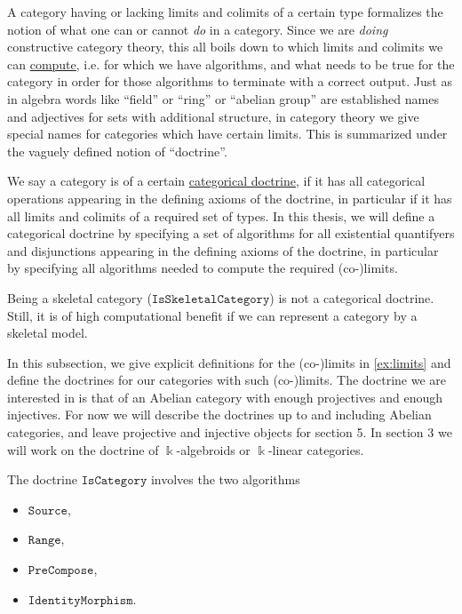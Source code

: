 A category having or lacking limits and colimits of a certain type formalizes the notion of what one can or cannot \textit{do} in a category.
Since we are \textit{doing} constructive category theory, this all boils down to which limits and colimits we can \ul{compute}, i.e. for which we
have algorithms, and what needs to be true for the category in order for those algorithms to terminate with a correct output.
Just as in algebra words like ``field'' or ``ring'' or ``abelian group'' are established names and adjectives for sets with additional structure,
in category theory we give special names for categories which have certain limits. This is summarized under the vaguely defined
notion of ``doctrine''.

We say a category is of a certain \ul{categorical doctrine}, if it has all categorical operations appearing in the
defining axioms of the doctrine, in particular if it has all limits and colimits of a required set of types.
In this thesis, we will define a categorical doctrine by specifying a set of algorithms for all existential quantifyers and
disjunctions appearing in the defining axioms of the doctrine, in particular by specifying all algorithms needed to
compute the required (co-)limits.

Being a skeletal category ($\mathtt{IsSkeletalCategory}$) is not a categorical doctrine. Still, it is of high computational benefit
if we can represent a category by a skeletal model.

In this subsection, we give explicit definitions for the (co-)limits in \ref{ex:limits} and define the
doctrines for our categories with such (co-)limits. The doctrine we are interested in is that of an Abelian category with
enough projectives and enough injectives. For now we will describe the doctrines up to and including Abelian categories, and
leave projective and injective objects for section 5. In section 3 we will work on the doctrine of $\Bbbk$-algebroids or $\Bbbk$-linear
categories.

\begin{doctrine}[Category]\label{doc:category}
The doctrine $\mathtt{IsCategory}$ involves the two algorithms
\begin{itemize}
\item $\mathtt{Source}$,
\item $\mathtt{Range}$,
\item $\mathtt{PreCompose}$,
\item $\mathtt{IdentityMorphism}$.
\end{itemize}
\end{doctrine}


